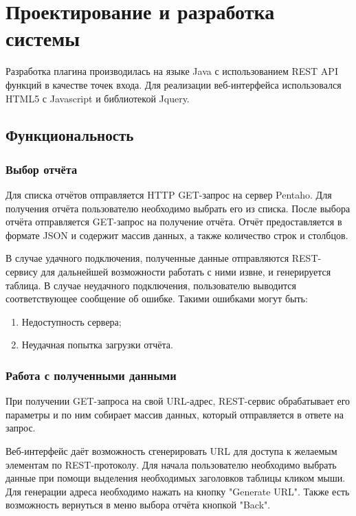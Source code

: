 \chapter{Проектирование и разработка системы}

Разработка плагина производилась на языке Java с использованием REST API функций в качестве точек входа. Для реализации веб-интерфейса использовался HTML5 с Javascript и библиотекой Jquery.

\section{Функциональность}

\subsection{Выбор отчёта}

Для списка отчётов отправляется HTTP GET-запрос на сервер Pentaho. Для получения отчёта пользователю необходимо выбрать его из списка. После выбора отчёта отправляется GET-запрос на получение отчёта. Отчёт предоставляется в формате JSON и содержит массив данных, а также количество строк и столбцов.

В случае удачного подключения, полученные данные отправляются REST-сервису для дальнейшей возможности работать с ними извне, и генерируется таблица. В случае неудачного подключения, пользователю выводится соответствующее сообщение об ошибке. Такими ошибками могут быть:

\begin{enumerate}
	\item Недоступность сервера;
	\item Неудачная попытка загрузки отчёта.
\end{enumerate}

\subsection{Работа с полученными данными}

При получении GET-запроса на свой URL-адрес, REST-сервис обрабатывает его параметры и по ним собирает массив данных, который отправляется в ответе на запрос.

Веб-интерфейс даёт возможность сгенерировать URL для доступа к желаемым элементам по REST-протоколу. Для начала пользователю необходимо выбрать данные при помощи выделения необходимых заголовков таблицы кликом мыши. Для генерации адреса необходимо нажать на кнопку "Generate URL". Также есть возможность вернуться в меню выбора отчёта кнопкой "Back".

